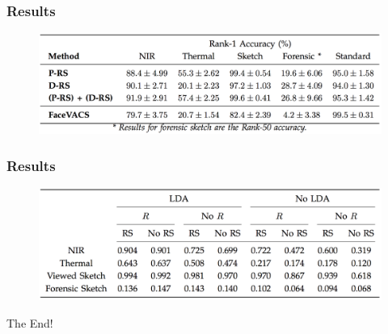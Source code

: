 \documentclass{beamer}
\begin{document}
\begin{frame}
\frametitle{Results}
\begin{figure}
\includegraphics[width=\textwidth]{prototyperesults}
\end{figure}
\end{frame}

\begin{frame}
\frametitle{Results}
\begin{figure}
\includegraphics[width=\textwidth]{prototyperesults2}
\end{figure}
\end{frame}

\begin{frame}
\centerline{The End!}
\end{frame}

\end{document}

